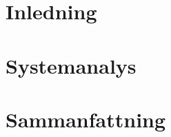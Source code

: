\documentclass[usenames,dvipsnames]{article}
\begin{document}

\tableofcontents\thispagestyle{empty}
\clearpage

\section{Inledning}


\newpage\section{Systemanalys}


\newpage\section{Sammanfattning}

\end{document}
